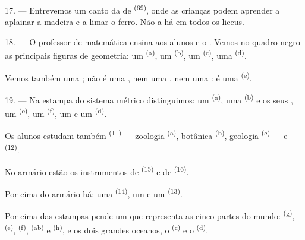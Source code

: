 17. --- Entrevemos um canto da  de 
\textsuperscript{(69)}, onde as crianças podem aprender a aplainar a madeira e
a limar o ferro. Não a há em todos os liceus.

\VUsaut{5.0mm}
\VUsaut{3.6mm}

18. --- O professor de matemática ensina aos alunos 
 e o . Vemos no
quadro-negro as principais figuras de geometria: um 
\textsuperscript{(a)}, um  \textsuperscript{(b)}, um 
\textsuperscript{(c)}, uma  \textsuperscript{(d)}.

Vemos também uma ; não é uma , nem uma
, nem uma : é uma 
\textsuperscript{(e)}.

19. --- Na estampa do sistema métrico distinguimos: um 
\textsuperscript{(a)}, uma  \textsuperscript{(b)} e os seus
, um  \textsuperscript{(e)}, um 
\textsuperscript{(f)}, um  e um 
\textsuperscript{(d)}.

Os alunos estudam também  \textsuperscript{(11)} ---
zoologia \textsuperscript{(a)}, botânica \textsuperscript{(b)}, geologia
\textsuperscript{(c)} --- e  \textsuperscript{(12)}.

No armário estão os instrumentos de  \textsuperscript{(15)} e de
 \textsuperscript{(16)}.

Por cima do armário há: uma  \textsuperscript{(14)}, um 
e um  \textsuperscript{(13)}.

Por cima das estampas pende um  que representa as cinco
partes do mundo:  \textsuperscript{(g)}, 
\textsuperscript{(e)},  \textsuperscript{(f)}, 
\textsuperscript{(ab)} e  \textsuperscript{(h)}, e os dois grandes
oceanos, o  \textsuperscript{(c)} e o 
\textsuperscript{(d)}.
\VUsaut{6.0mm}
\VUfilet{22mm}
